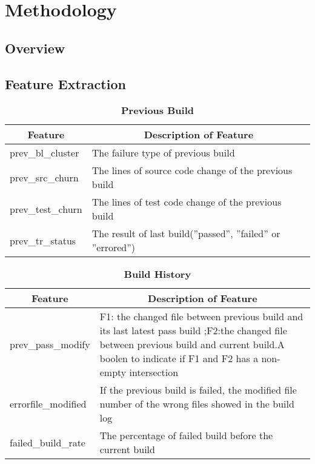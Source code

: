 
\section{Methodology}\label{sec:approach}

\subsection{Overview}

\subsection{Feature Extraction}
\begin{table}[!htbp] 
\setlength{\abovecaptionskip}{0.2cm}
\caption{\large{\textbf{Previous Build}}}

\begin{tabular}{|p{7em}|p{16em}|}
\hline
 \multicolumn{1}{|c|}{\textbf{Feature}} &\multicolumn{1}{|c|}{\textbf{Description of Feature}}\\
\hline
 prev\_bl\_cluster & The failure type of previous build \\ \hline
 prev\_src\_churn & The lines of source code change of the previous build \\ \hline
 prev\_test\_churn & The lines of test code change of the previous build \\ \hline
 prev\_tr\_status & The result of last build(”passed”, ”failed” or ”errored”) \\ \hline
\end{tabular}
\end{table}
\begin{table}[!htbp] 
\setlength{\abovecaptionskip}{0.2cm}
\caption{\large{\textbf{Build History}}}

\begin{tabular}{|p{7em}|p{16em}|}
\hline
 \multicolumn{1}{|c|}{\textbf{Feature}} &\multicolumn{1}{|c|}{\textbf{Description of Feature}}\\
\hline
 prev\_pass\_modify & F1: the changed file between previous build and its last latest pass build ;F2:the changed file between previous build and current build.A boolen to indicate if F1 and F2 has a non-empty intersection \\ \hline
 errorfile\_modified & If the previous build is failed, the modified file number of  the wrong files showed in the build log \\ \hline
 failed\_build\_rate & The percentage of failed build before the current build \\ \hline


\end{tabular}
\end{table}

